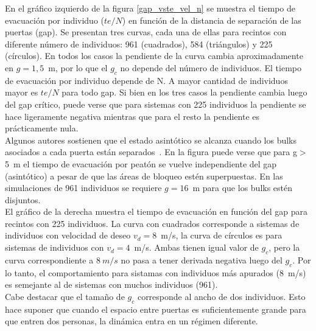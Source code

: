 En el gráfico izquierdo de la figura \ref{gap_vste_vel_n} se muestra el tiempo de evacuación por individuo ($te/N$) en función de la distancia de separación de las puertas (gap). Se presentan tres curvas, cada una de ellas para recintos con diferente número de individuos: 961 (cuadrados), 584 (triángulos) y 225 (círculos). En todos los casos la pendiente de la curva cambia aproximadamente en $g=1,5$~m, por lo que el $g_c$ no depende del número de individuos. 
El tiempo de evacuación por individuo depende de N. A mayor cantidad de individuos mayor es $te/N$ para todo gap. 
Si bien en los tres casos la pendiente cambia luego del gap crítico, puede verse que para sistemas con 225 individuos la pendiente se hace ligeramente negativa mientras que para el resto la pendiente es prácticamente nula. \\

Algunos autores sostienen que el estado asintótico se alcanza cuando los bulks asociados a cada puerta están separados~\cite{perez1}. En la figura puede verse que para g$>$5~m el tiempo de evacuación por peatón se vuelve independiente del gap (asintótico) a pesar de que las áreas de bloqueo estén superpuestas. En las simulaciones de 961 individuos se requiere $g=16$~m para que los bulks estén disjuntos.\\

El gráfico de la derecha muestra el tiempo de evacuación en función del gap para recintos con 225 individuos. La curva con cuadrados corresponde a sistemas de individuos con velocidad de deseo $v_d=8$~m/s, la curva de círculos es para sistemas de individuos con $v_d=4$~m/s. Ambas tienen igual valor de $g_c$, pero la curva correspondiente a $8~m/s$ no pasa a tener derivada negativa luego del $g_c$. Por lo tanto, el comportamiento para sistamas con individuos más apurados (8~m/s) es semejante al de sistemas con muchos individuos (961). \\

Cabe destacar que el tamaño de $g_c$ corresponde al ancho de dos individuos. Esto hace suponer que cuando el espacio entre puertas es suficientemente grande para que entren dos personas, la dinámica entra en un régimen diferente. 

